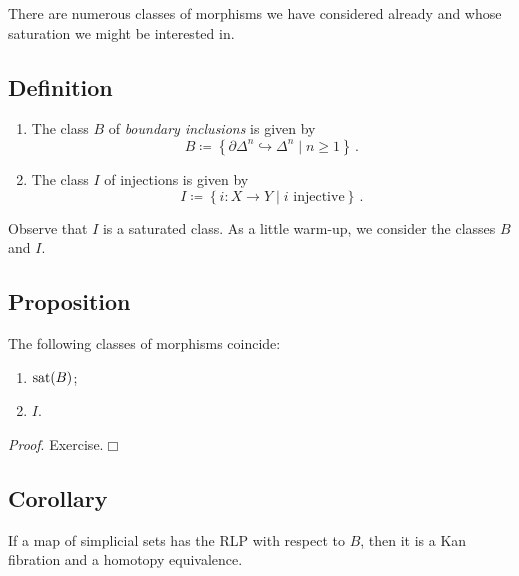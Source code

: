         There are numerous classes of morphisms we have considered already and whose saturation we might be interested in.

    \subsection{Definition}
        \begin{enumerate}[label=\roman*)]
            \item 
                The class $B$ of \emph{boundary inclusions} is given by
                \begin{equation*}
                    B \coloneq \left\{ \partial \Delta^n \hookrightarrow \Delta^n \mid n \geq 1 \right\} \,.
                \end{equation*}
            \item 
                The class $I$ of injections is given by
                \begin{equation*}
                    I \coloneq \left\{ i \colon X \to Y \mid i \text{ injective} \right\} \,.
                \end{equation*}
        \end{enumerate}
        Observe that $I$ is a saturated class. As a little warm-up, we consider the classes $B$ and $I$.

    \subsection{Proposition}\label{chV-2-7}
        The following classes of morphisms coincide:
        \begin{enumerate}[label=\roman*)]
            \item 
                $\operatorname{sat}(B)$;
            \item 
                $I$.
        \end{enumerate}
        \smallskip

        \emph{Proof}. Exercise.\hfill$\Box$

    \subsection{Corollary}\label{chV-2-8}
        If a map of simplicial sets has the RLP with respect to $B$, then it is a Kan fibration and a homotopy equivalence.
        \smallskip

